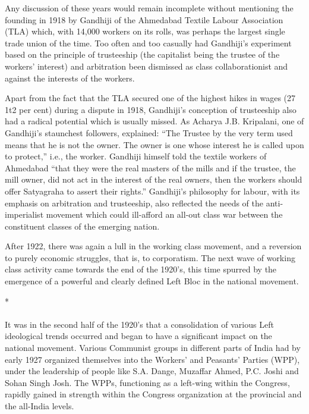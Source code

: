 \begin{multicols}{2}
Any discussion of these years would remain incomplete without mentioning the founding in 1918 by Gandhiji of the Ahmedabad Textile Labour Association (TLA) which, with 14,000 workers on its rolls, was perhaps the largest single trade union of the time. Too often and too casually had Gandhiji's experiment based on the principle of trusteeship (the capitalist being the trustee of the workers' interest) and arbitration been dismissed as class collaborationist and against the interests of the workers.

Apart from the fact that the TLA secured one of the highest hikes in wages (27 1t2 per cent) during a dispute in 1918, Gandhiji's conception of trusteeship also had a radical potential which is usually missed. As Acharya J.B. Kripalani, one of Gandhiji's staunchest followers, explained: ``The Trustee by the very term used means that he is not the owner. The owner is one whose interest he is called upon to protect,'' i.e., the worker. Gandhiji himself told the textile workers of Ahmedabad ``that they were the real masters of the mills and if the trustee, the mill owner, did not act in the interest of the real owners, then the workers should offer Satyagraha to assert their rights.'' Gandhiji's philosophy for labour, with its emphasis on arbitration and trusteeship, also reflected the needs of the anti-imperialist movement which could ill-afford an all-out class war between the constituent classes of the emerging nation.

After 1922, there was again a lull in the working class movement, and a reversion to purely economic struggles, that is, to corporatism. The next wave of working class activity came towards the end of the 1920's, this time spurred by the emergence of a powerful and clearly defined Left Bloc in the national movement.

\begin{center}*\end{center}

\paragraph*{}
It was in the second half of the 1920's that a consolidation of various Left ideological trends occurred and began to have a significant impact on the national movement. Various Communist groups in different parts of India had by early 1927 organized themselves into the Workers' and Peasants' Parties (WPP), under the leadership of people like S.A. Dange, Muzaffar Ahmed, P.C. Joshi and Sohan Singh Josh. The WPPs, functioning as a left-wing within the Congress, rapidly gained in strength within the Congress organization at the provincial and the all-India levels.


\end{multicols}
